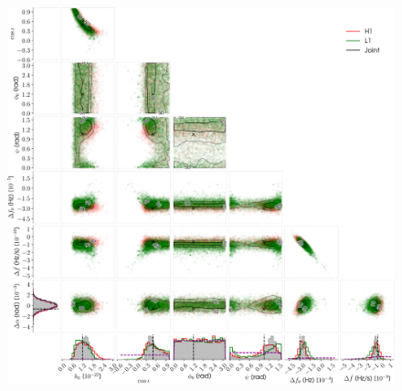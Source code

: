 \begin{figure}[!phtb]
\begin{center}
\includegraphics[width=1\columnwidth]{./figures/codeeval/simulations/signal_freq/two/ffdot_inj2}
\caption{ \protect}
\end{center}
\end{figure}
